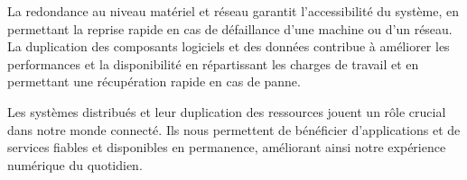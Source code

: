 \documentclass[a11paper, 11pt]{article}
\begin{document}
La redondance au niveau matériel et réseau garantit l'accessibilité du système, en permettant la reprise rapide en cas de défaillance d'une machine ou d'un réseau. La duplication des composants logiciels et des données contribue à améliorer les performances et la disponibilité en répartissant les charges de travail et en permettant une récupération rapide en cas de panne.

Les systèmes distribués et leur duplication des ressources jouent un rôle crucial dans notre monde connecté. Ils nous permettent de bénéficier d'applications et de services fiables et disponibles en permanence, améliorant ainsi notre expérience numérique du quotidien.

\end{document}
